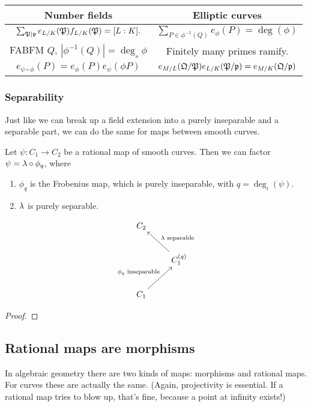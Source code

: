 \begin{center}
\begin{tabular}{c|c}
Number fields & Elliptic curves\tabularnewline
\hline
$\sum_{\mathfrak{P}\mid\mathfrak{p}}e_{L/K}(\mathfrak{P})f_{L/K}(\mathfrak{P})=[L:K].$ & $\sum_{P\in\phi^{-1}(Q)}e_{\phi}(P)=\deg(\phi)$\tabularnewline
FABFM $Q$, $|\phi^{-1}(Q)|=\deg_{s}\phi$ & Finitely many primes ramify.\tabularnewline
$e_{\psi\circ\phi}(P)=e_{\phi}(P)e_{\psi}(\phi P)$ & $e_{M/L}(\mathfrak{Q}/\mathfrak{P})e_{L/K}(\mathfrak{P}/\mathfrak{p})=e_{M/K}(\mathfrak{Q}/\mathfrak{p})$\tabularnewline
\end{tabular}
\end{center}

\subsubsection{Separability}

Just like we can break up a field extension into a purely inseparable and a separable part, we can do the same for maps between smooth curves.
\begin{pr}
Let $\psi:C_1\to C_2$ be a rational map of smooth curves. Then we can factor $\psi=\lambda\circ \phi_q$, where 
\begin{enumerate}
\item
$\phi_q$ is the Frobenius map, which is purely inseparable, with $q=\deg_i(\psi)$.
\item
$\lambda$ is purely separable.
\end{enumerate}
\[
\xymatrix{
C_2&\\
& C_1^{(q)}\ar[lu]_{\la\text{ separable}}\\
C_1\ar[ru]^{\phi_q\text{ inseparable}}&
}
\]
\end{pr}
\begin{proof}

\end{proof}

\subsection{Rational maps are morphisms}
In algebraic geometry there are two kinds of maps: morphisms and rational maps. For curves these are actually the same. (Again, projectivity is essential. If a rational map tries to blow up, that's fine, because a point at infinity exists!)


